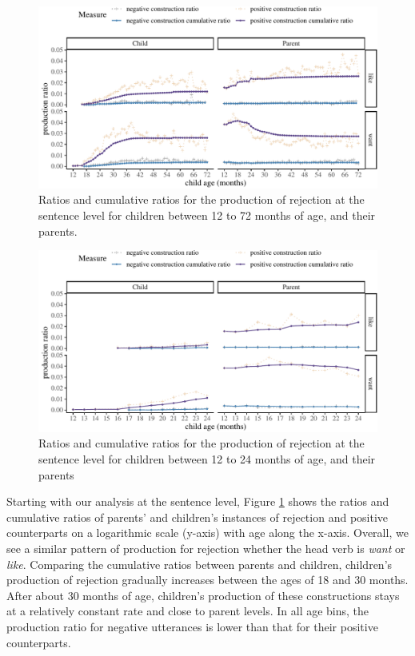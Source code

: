 \documentclass[
  english,
  man,floatsintext]{apa6}
\begin{document}
\begin{figure}[H]

{\centering \includegraphics{neg_construction_article_files/figure-latex/emotion-1} 

}

\caption{Ratios and cumulative ratios for the production of rejection at the sentence level for children between 12 to 72 months of age, and their parents.}\label{fig:emotion}
\end{figure}

\begin{figure}[H]

{\centering \includegraphics{neg_construction_article_files/figure-latex/emotionbegin-1} 

}

\caption{Ratios and cumulative ratios for the production of rejection at the sentence level for children between 12 to 24 months of age, and their parents}\label{fig:emotionbegin}
\end{figure}

Starting with our analysis at the sentence level, Figure \ref{fig:emotion} shows the ratios and cumulative ratios of parents' and children's instances of rejection and positive counterparts on a logarithmic scale (y-axis) with age along the x-axis. Overall, we see a similar pattern of production for rejection whether the head verb is \emph{want} or \emph{like}. Comparing the cumulative ratios between parents and children, children's production of rejection gradually increases between the ages of 18 and 30 months. After about 30 months of age, children's production of these constructions stays at a relatively constant rate and close to parent levels. In all age bins, the production ratio for negative utterances is lower than that for their positive counterparts.
\end{document}
